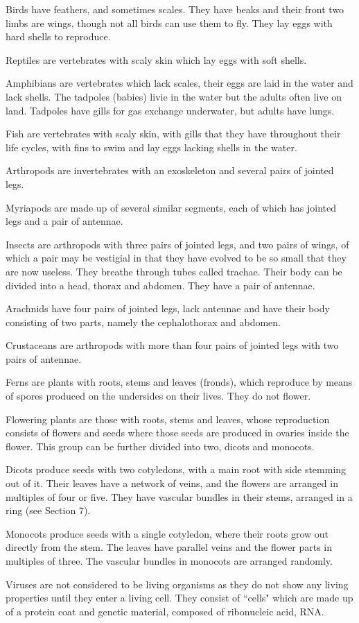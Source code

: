 Birds have feathers, and sometimes scales. They have beaks and their front two limbs are wings,
though not all birds can use them to fly. They lay eggs with hard shells to reproduce.

Reptiles are vertebrates with scaly skin which lay eggs with soft shells.

Amphibians are vertebrates which lack scales, their eggs are laid in the water and lack shells.
The tadpoles (babies) livie in the water but the adults often live on land. Tadpoles have gills
for gas exchange underwater, but adults have lungs.


Fish are vertebrates with scaly skin, with gills that they have throughout their life cycles,
with fins to swim and lay eggs lacking shells in the water.

Arthropods are invertebrates with an exoskeleton and several pairs of jointed legs.

Myriapods are made up of several similar segments, each of which has jointed legs and a pair of
antennae.

Insects are arthropods with three pairs of jointed legs, and two pairs of wings, of which a pair
may be vestigial in that they have evolved to be so small that they are now useless. They breathe
through tubes called trachae. Their body can be divided into a head, thorax and abdomen. They have
a pair of antennae.

Arachnids have four pairs of jointed legs, lack antennae and have their body consisting of two 
parts, namely the cephalothorax and abdomen.

Crustaceans are arthropods with more than four pairs of jointed legs with two pairs of antennae.

Ferns are plants with roots, stems and leaves (fronds), which reproduce by means of spores 
produced on the undersides on their lives. They do not flower.

Flowering plants are those with roots, stems and leaves, whose reproduction consists of flowers and
seeds where those seeds are produced in ovaries inside the flower. This group can be further 
divided into two, dicots and monocots. 

Dicots produce seeds with two cotyledons, with a main root with side stemming out of it. Their leaves
have a network of veins, and the flowers are arranged in multiples of four or five. They have
vascular bundles in their stems, arranged in a ring (see Section 7).

Monocots produce seeds with a single cotyledon, where their roots grow out directly from the stem.
The leaves have parallel veins and the flower parts in multiples of three. The vascular bundles
in monocots are arranged randomly.

Viruses are not considered to be living organisms as they do not show any living properties until
they enter a living cell. They consist of ``cells" which are made up of a protein coat and genetic
material, composed of ribonucleic acid, RNA.
